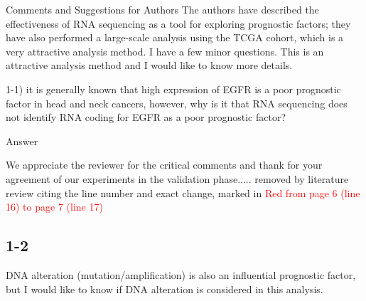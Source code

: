 \documentclass[preprint,12pt]{elsarticle}
\newenvironment{MyColorPar}[1]{%
    \leavevmode\color{#1}\ignorespaces%
}{%
}%
\begin{document}
Comments and Suggestions for Authors
The authors have described the effectiveness of RNA sequencing as a tool for exploring prognostic factors; they have also performed a large-scale analysis using the TCGA cohort, which is a very attractive analysis method. I have a few minor questions.
This is an attractive analysis method and I would like to know more details.

1-1) it is generally known that high expression of EGFR is a poor prognostic factor in head and neck cancers, however, why is it that RNA sequencing does not identify RNA coding for EGFR as a poor prognostic factor?

\begin{MyColorPar}{blue}
Answer

We appreciate the reviewer for the critical comments and thank for your agreement of our experiments in the validation phase.....
removed by literature review
citing the line number and exact change, marked in \textcolor{red}{Red from page 6 (line 16) to page 7 (line 17)}
\end{MyColorPar}

\subsection*{1-2}
 DNA alteration (mutation/amplification) is also an influential prognostic factor, but I would like to know if DNA alteration is considered in this analysis.
\end{document}
